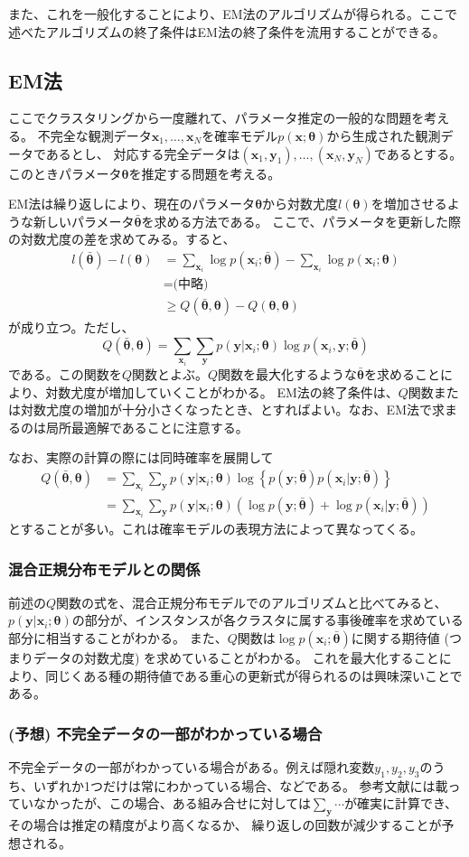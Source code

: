 \documentclass[9pt,draft,twocolumn]{jsarticle}
\newcommand{\bmx}{{\bm{x}}}
\newcommand{\bmy}{{\bm{y}}}
\newcommand{\bmt}{{\bm\theta}}
\newcommand{\bmtb}{\bar\bmt}
\newcommand{\dsum}{\displaystyle\sum}
\begin{document}
また、これを一般化することにより、EM法のアルゴリズムが得られる。ここで述べたアルゴリズムの終了条件はEM法の終了条件を流用することができる。

\subsection{EM法}
ここでクラスタリングから一度離れて、パラメータ推定の一般的な問題を考える。
不完全な観測データ$\bm{x}_1,\ldots,\bm{x}_N$を確率モデル$p(\bm
x;\bm\theta)$から生成された観測データであるとし、 対応する完全データは$(\bm{x}_1,\bm{y}_1),\ldots,(\bm{x}_N,\bm{y}_N)$であるとする。
このときパラメータ$\bm{\theta}$を推定する問題を考える。

EM法は繰り返しにより、現在のパラメータ$\bm\theta$から対数尤度$l(\bm\theta)$を増加させるような新しいパラメータ$\bar{\bm\theta}$を求める方法である。
ここで、パラメータを更新した際の対数尤度の差を求めてみる。すると、
\[
\begin{split}
l(\bar{\bm\theta}) - l(\bm\theta) &= \sum_{\bm{x}_i} \log p(\bm x_i;\bmtb)
	- \sum_{\bm x_i} \log p(\bm x_i;\bmt) \\
	&= \text{(中略)} \\
	&\ge Q(\bmtb,\bmt) -Q(\bmt,\bmt)
\end{split}
\]
が成り立つ。ただし、
\[ Q(\bmtb,\bmt) = \sum_{\bm x_i} \sum_\bmy p(\bmy | \bmx_i ;\bmt) \log p(\bmx_i,\bmy;\bmtb) \]
である。この関数を$Q$関数とよぶ。$Q$関数を最大化するような$\bmtb$を求めることにより、対数尤度が増加していくことがわかる。
EM法の終了条件は、$Q$関数または対数尤度の増加が十分小さくなったとき、とすればよい。なお、EM法で求まるのは局所最適解であることに注意する。

なお、実際の計算の際には同時確率を展開して
\[
\begin{split}
Q(\bmtb,\bmt) &= \sum_{\bm x_i} \sum_\bmy p(\bmy | \bmx_i ;\bmt) 
	\log \left\{ p(\bmy;\bmtb) p(\bmx_i|\bmy;\bmtb) \right\} \\
&= \sum_{\bm x_i} \sum_\bmy p(\bmy | \bmx_i ;\bmt) 
	( \log p(\bmy;\bmtb) + \log p(\bmx_i|\bmy;\bmtb) )
\end{split} 
\]
とすることが多い。これは確率モデルの表現方法によって異なってくる。

\subsubsection{混合正規分布モデルとの関係}
前述の$Q$関数の式を、混合正規分布モデルでのアルゴリズムと比べてみると、$p(\bmy | \bmx_i
;\bmt)$の部分が、インスタンスが各クラスタに属する事後確率を求めている部分に相当することがわかる。
また、$Q$関数は$\log p(\bmx_i;\bmtb)$に関する期待値 (つまりデータの対数尤度) を求めていることがわかる。
これを最大化することにより、同じくある種の期待値である重心の更新式が得られるのは興味深いことである。

\subsubsection{(予想) 不完全データの一部がわかっている場合}
不完全データの一部がわかっている場合がある。例えば隠れ変数$y_1,y_2,y_3$のうち、いずれか1つだけは常にわかっている場合、などである。
参考文献には載っていなかったが、この場合、ある組み合せに対しては$\dsum_\bmy\cdots$が確実に計算でき、その場合は推定の精度がより高くなるか、
繰り返しの回数が減少することが予想される。



\end{document}

